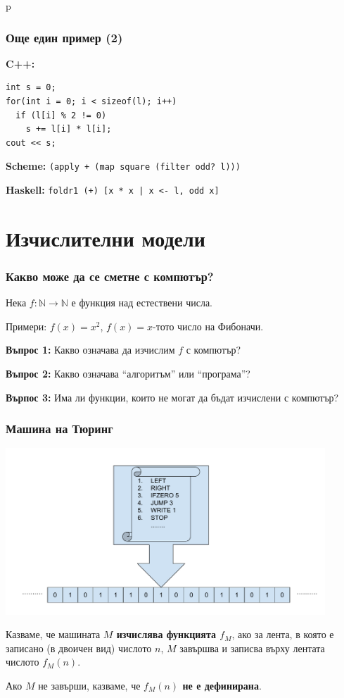 p\documentclass{beamer}
\begin{document}
\begin{frame}[fragile]
  \frametitle{Още един пример (2)}
  \textbf{C++:}
\begin{verbatim}
int s = 0;
for(int i = 0; i < sizeof(l); i++)
  if (l[i] % 2 != 0)
    s += l[i] * l[i];
cout << s;
\end{verbatim}

  \pause
  \textbf{Scheme:} \tt{(apply + (map square (filter odd? l)))}
  \vspace{1em}

  \pause
  \textbf{Haskell:} \tt{foldr1 (+) [x * x | x <- l, odd x]}
\end{frame}

\section*{Изчислителни модели}

\begin{frame}
  \frametitle{Какво може да се сметне с компютър?}

  Нека $f:\mathbb N\to\mathbb N$ е функция над естествени числа.

  Примери: $f(x) = x^2$, $f(x) = x$-тото число на Фибоначи.
  \vspace{2em}
  \pause

  \textbf{Въпрос 1:} Какво означава да изчислим $f$ с компютър?
  \vspace{2em}
  \pause

  \textbf{Въпрос 2:} Какво означава ``алгоритъм'' или ``програма''?
  \vspace{2em}

  \pause

  \textbf{Върпос 3:} Има ли функции, които не могат да бъдат изчислени с компютър?
\end{frame}

\begin{frame}
  \frametitle{Машина на Тюринг}

  \includegraphics[width=0.9\textwidth]{turing.pdf}

  Казваме, че машината \textbf{$M$ изчислява функцията $f_M$}, ако за лента, в която е записано (в двоичен вид) числото $n$, $M$ завършва и записва върху лентата числото $f_M(n)$.

  Ако $M$ не завърши, казваме, че \textbf{$f_M(n)$ не е дефинирана}.
\end{frame}
\end{document}
